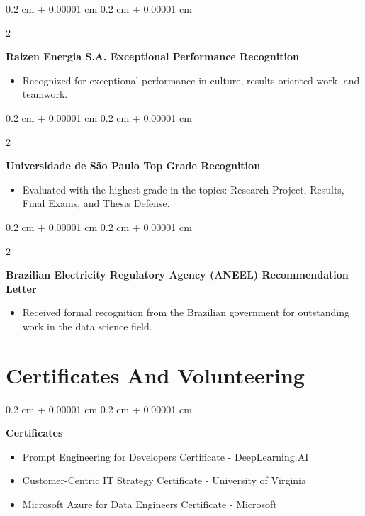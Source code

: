 \documentclass[10pt, letterpaper]{article}
\newenvironment{highlights}{
    \begin{itemize}[
        topsep=0.10 cm,
        parsep=0.10 cm,
        partopsep=0pt,
        itemsep=0pt,
        leftmargin=0.4 cm + 10pt
    ]
}{
    \end{itemize}
} %
\newenvironment{onecolentry}{
    \begin{adjustwidth}{
        0.2 cm + 0.00001 cm
    }{
        0.2 cm + 0.00001 cm
    }
}{
    \end{adjustwidth}
} %
\newenvironment{twocolentry}[2][]{
    \onecolentry
    \def\secondColumn{#2}
    \setcolumnwidth{\fill, 4.5 cm}
    \begin{paracol}{2}
}{
    \switchcolumn \raggedleft \secondColumn
    \end{paracol}
    \endonecolentry
} %
\begin{document}
        \vspace{0.2 cm}

        \begin{twocolentry}{
            2023
        }
            \textbf{Raizen Energia S.A. Exceptional Performance Recognition}
            \begin{highlights}
                \item Recognized for exceptional performance in culture, results-oriented work, and teamwork.
            \end{highlights}
        \end{twocolentry}


        \vspace{0.2 cm}

        \begin{twocolentry}{
            2023
        }
            \textbf{Universidade de São Paulo Top Grade Recognition}
            \begin{highlights}
                \item Evaluated with the highest grade in the topics: Research Project, Results, Final Exams, and Thesis Defense.
            \end{highlights}
        \end{twocolentry}


        \vspace{0.2 cm}

        \begin{twocolentry}{
            2021
        }
            \textbf{Brazilian Electricity Regulatory Agency (ANEEL) Recommendation Letter}
            \begin{highlights}
                \item Received formal recognition from the Brazilian government for outstanding work in the data science field.
            \end{highlights}
        \end{twocolentry}



    
    \section{Certificates And Volunteering}



        
        \begin{onecolentry}
            \textbf{Certificates}
            \begin{highlights}
                \item Prompt Engineering for Developers Certificate - DeepLearning.AI
                \item Customer-Centric IT Strategy Certificate - University of Virginia
                \item Microsoft Azure for Data Engineers Certificate - Microsoft
            \end{highlights}
        \end{onecolentry}
\end{document}
